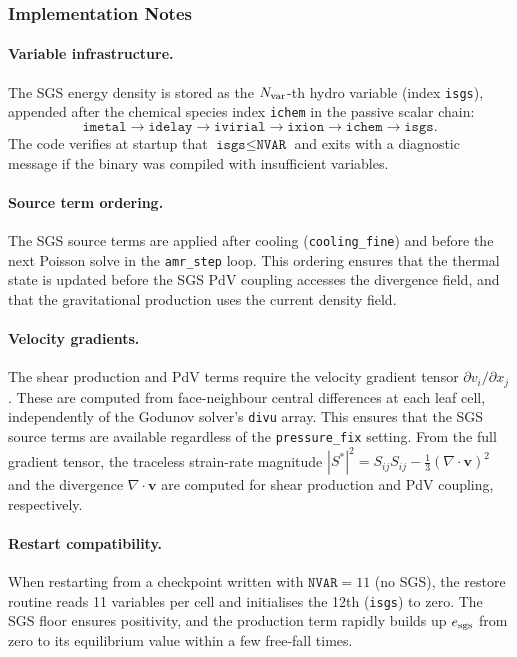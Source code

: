 \documentclass[fleqn,usenatbib]{mnras}
\newcommand{\code}[1]{\texttt{#1}}
\begin{document}
\subsubsection{Implementation Notes}
\label{sec:sgs_impl}

\paragraph{Variable infrastructure.}
The SGS energy density is stored as the $N_{\rm var}$-th hydro
variable (index \code{isgs}), appended after the chemical species
index \code{ichem} in the passive scalar chain:
\begin{equation*}
  \code{imetal} \to \code{idelay} \to \code{ivirial}
  \to \code{ixion} \to \code{ichem} \to \code{isgs}.
\end{equation*}
The code verifies at startup that $\code{isgs} \le \code{NVAR}$
and exits with a diagnostic message if the binary was compiled with
insufficient variables.

\paragraph{Source term ordering.}
The SGS source terms are applied after cooling
(\code{cooling\_fine}) and before the next Poisson solve in the
\code{amr\_step} loop.  This ordering ensures that the thermal
state is updated before the SGS PdV coupling accesses the divergence
field, and that the gravitational production uses the current
density field.

\paragraph{Velocity gradients.}
The shear production and PdV terms require the velocity gradient
tensor $\partial v_i / \partial x_j$.  These are computed from
face-neighbour central differences at each leaf cell, independently
of the Godunov solver's \code{divu} array.  This ensures that the
SGS source terms are available regardless of the
\code{pressure\_fix} setting.  From the full gradient tensor, the
traceless strain-rate magnitude $|S^\ast|^2 = S_{ij}S_{ij} -
\frac{1}{3}(\nabla\cdot\mathbf{v})^2$ and the divergence
$\nabla\cdot\mathbf{v}$ are computed for shear production and PdV
coupling, respectively.

\paragraph{Restart compatibility.}
When restarting from a checkpoint written with $\code{NVAR}=11$
(no SGS), the restore routine reads 11 variables per cell and
initialises the 12th (\code{isgs}) to zero.  The SGS floor ensures
positivity, and the production term rapidly builds up
$e_{\rm sgs}$ from zero to its equilibrium value within a few
free-fall times.
\end{document}
